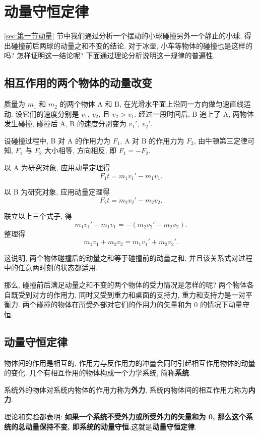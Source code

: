 \documentclass[UTF8,openany,fontset=fandol]{ctexbook}
\theoremstyle{chinesetextbook}
\begin{document}
\section{动量守恒定律}
\ref{sec:第一节动量} 节中我们通过分析一个摆动的小球碰撞另外一个静止的小球, 得出碰撞前后两球的动量之和不变的结论. 对于冰壶, 小车等物体的碰撞也是这样的吗? 怎样证明这一结论呢? 下面通过理论分析说明这一规律的普遍性.
\subsection{相互作用的两个物体的动量改变}
质量为 $m_1$ 和 $m_2$ 的两个物体 A 和 B, 在光滑水平面上沿同一方向做匀速直线运动. 设它们的速度分别是 $v_1,\ v_2$, 且 $v_2>v_1$. 经过一段时间后, B 追上了 A, 两物体发生碰撞, 碰撞后 A, B 的速度分别变为 $v_1',\ v_2'$.

设碰撞过程中, B 对 A 的作用力为 $F_1$, A 对 B 的作用力为 $F_2$, 由牛顿第三定律可知, $F_1$ 与 $F_2$ 大小相等, 方向相反, 即 $F_1=-F_2$.

以 A 为研究对象, 应用动量定理得
\[
F_1t=m_1v_1'-m_1v_1.
\]

以 B 为研究对象, 应用动量定理得
\[
F_2t=m_2v_2'-m_2v_2.
\]

联立以上三个式子, 得
\begin{equation}\label{eq:动量守恒1}
m_1v_1'-m_1v_1=-(m_2v_2'-m_2v_2).
\end{equation}
整理得
\begin{equation}\label{eq:动量守恒2}
m_1v_1+m_2v_2=m_1v_1'+m_2v_2'.
\end{equation}

这说明, 两个物体碰撞后的动量之和等于碰撞前的动量之和, 并且该关系式对过程中的任意两时刻的状态都适用.

那么, 碰撞前后满足动量之和不变的两个物体的受力情况是怎样的呢? 两个物体各自既受到对方的作用力, 同时又受到重力和桌面的支持力, 重力和支持力是一对平衡力. 两个碰撞的物体在所受外部对它们的作用力的矢量和为 0 的情况下动量守恒.
\subsection{动量守恒定律}
物体间的作用是相互的, 作用力与反作用力的冲量会同时引起相互作用物体的动量的变化. 几个有相互作用的物体构成一个力学系统, 简称\textbf{系统}.

系统外的物体对系统内物体的作用力称为\textbf{外力}, 系统内物体间的相互作用力称为\textbf{内力}.

理论和实验都表明: \textbf{如果一个系统不受外力或所受外力的矢量和为 0, 那么这个系统的总动量保持不变, 即系统的动量守恒.}这就是\textbf{动量守恒定律}.
\end{document}
